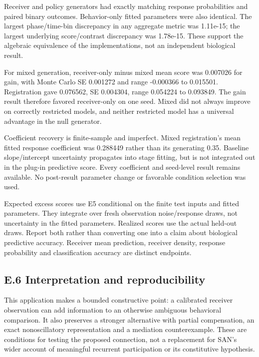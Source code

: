\documentclass[
  american,
  11pt,
  letterpaper,
]{article}
\begin{document}
Receiver and policy generators had exactly matching response probabilities and paired binary outcomes. Behavior-only fitted parameters were also identical. The largest phase/time-bin discrepancy in any aggregate metric was 1.11e-15; the largest underlying score/contrast discrepancy was 1.78e-15. These support the algebraic equivalence of the implementations, not an independent biological result.

For mixed generation, receiver-only minus mixed mean score was 0.007026 for gain, with Monte Carlo SE 0.001272 and range -0.000366 to 0.015501. Registration gave 0.076562, SE 0.004304, range 0.054224 to 0.093849. The gain result therefore favored receiver-only on one seed. Mixed did not always improve on correctly restricted models, and neither restricted model has a universal advantage in the null generator.

Coefficient recovery is finite-sample and imperfect. Mixed registration's mean fitted response coefficient was 0.288449 rather than its generating 0.35. Baseline slope/intercept uncertainty propagates into stage fitting, but is not integrated out in the plug-in predictive score. Every coefficient and seed-level result remains available. No post-result parameter change or favorable condition selection was used.

Expected excess scores use E5 conditional on the finite test inputs and fitted parameters. They integrate over fresh observation noise/response draws, not uncertainty in the fitted parameters. Realized scores use the actual held-out draws. Report both rather than converting one into a claim about biological predictive accuracy. Receiver mean prediction, receiver density, response probability and classification accuracy are distinct endpoints.

\subsection{E.6 Interpretation and reproducibility}\label{e.6-interpretation-and-reproducibility}

This application makes a bounded constructive point: a calibrated receiver observation can add information to an otherwise ambiguous behavioral comparison. It also preserves a stronger alternative with partial compensation, an exact nonoscillatory representation and a mediation counterexample. These are conditions for testing the proposed connection, not a replacement for SAN's wider account of meaningful recurrent participation or its constitutive hypothesis.
\end{document}
